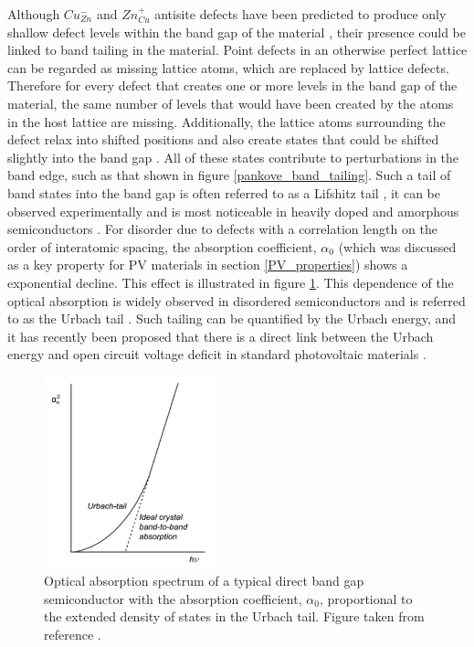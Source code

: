 Although $Cu_{Zn}^{-}$ and $Zn_{Cu}^{+}$ antisite defects have been predicted to produce only shallow defect levels within the band gap of the material \cite{defect1}, their presence could be linked to band tailing in the material. 
Point defects in an otherwise perfect lattice can be regarded as missing lattice atoms, which are replaced by lattice defects. Therefore for every defect that creates one or more levels in the band gap of the material, the same number of levels that would have been created by the atoms in the host lattice are missing. Additionally, the lattice atoms surrounding the defect relax into shifted positions and also create states that could be shifted slightly into the band gap \cite{thin_film_Boer}. All of these states contribute to perturbations in the band edge, such as that shown in figure \ref{pankove_band_tailing}. Such a tail of band states into the band gap is often referred to as a Lifshitz tail \cite{Lifshitz1964}, it can be observed experimentally and is most noticeable in heavily doped and amorphous semiconductors \cite{thin_film_Boer}. For disorder due to defects with a correlation length on the order of interatomic spacing, the absorption coefficient, $\alpha_{0}$ (which was discussed as a key property for PV materials in section \ref{PV_properties}) shows a exponential decline. This effect is illustrated in figure \ref{urbach_fig}. This dependence of the optical absorption is widely observed in disordered semiconductors \cite{thin_film_Boer} and is referred to as the Urbach tail \cite{Urbach1953}. Such tailing can be quantified by the Urbach energy, and it has recently been proposed that there is a direct link between the Urbach energy and open circuit voltage deficit in standard photovoltaic materials \cite{culprit, UrbachE_Voc}.

\begin{figure}[h!]
  \centering
    \includegraphics[width=0.45\textwidth]{figures/urbach_fig.png}
    \caption{Optical absorption spectrum of a typical direct band gap semiconductor with the absorption coefficient, $\alpha_{0}$, proportional to the extended density of states in the Urbach tail. Figure taken from reference .}
  \label{urbach_fig}
\end{figure}


